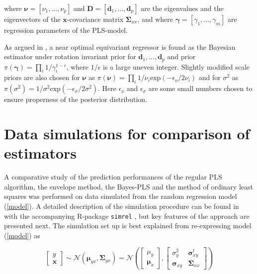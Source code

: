 \documentclass[a4paper, 11pt]{article}
\begin{document}
where $\bm{\nu}=[\nu_1,...,\nu_p]$ and $\bm{D}=[\bm{d}_1,...,\bm{d}_p]$ are the eigenvalues and the eigenvectors of the $\bm{x}$-covariance matrix $\bm{\Sigma}_{xx}$, and where $\bm{\gamma}=[\gamma_1,...,\gamma_m]$ are regression parameters of the PLS-model.

As argued in \citet{helland2012near}, a near optimal equivariant regressor is
found as the Bayesian estimator under rotation invariant prior for
$\bm{d}_1,...,\bm{d}_p$ and prior $\pi(\bm{\gamma})=\prod_i
1/\gamma_i^{1-\epsilon}$, where $1/\epsilon$ is a large uneven integer. Slightly
modified scale priors are also chosen for $\bm{\nu}$ as $\pi(\bm{\nu}) =\prod_i
1/\nu_i \mathrm{exp}(-\epsilon_\nu/2\nu_i)$ and for $\sigma^2$ as$ \pi(\sigma^2)=1/\sigma^2\mathrm{exp}(-\epsilon_\sigma/2\sigma^2)$. Here $\epsilon_\nu$ and $\epsilon_\sigma$ are some small numbers chosen to ensure properness of the posterior distribution.


\section{Data simulations for comparison of estimators}
\label{sec:data-simulation}

A comparative study of the prediction performances of the regular PLS algorithm, the envelope method, the Bayes-PLS and the method of ordinary least squares was performed on data simulated from the random regression model (\ref{model}). A detailed description of the simulation procedure can be found in \citep{saebo2015simrel} with the accompanying R-package {\tt simrel} \citep{saebo2015simrel}, but key features of the approach are presented next. The simulation set up is best explained from re-expressing model (\ref{model}) as

\begin{equation}
  \label{eq:rand-reg-model}
  \begin{bmatrix}
    y \\ \mathbf{x}
  \end{bmatrix} \sim
  \mathcal{N}\left( \boldsymbol{\mu}_{yx}, \boldsymbol{\Sigma}_{yx} \right) =
  \mathcal{N}\left(
    \begin{bmatrix}
      \mu_y \\ \boldsymbol{\mu}_x
    \end{bmatrix},
    \begin{bmatrix}
      \sigma_y^2               & \boldsymbol{\sigma}_{xy}^t \\
      \boldsymbol{\sigma}_{xy} & \boldsymbol{\Sigma}_{xx}
    \end{bmatrix}
  \right)
\end{equation}
\end{document}
